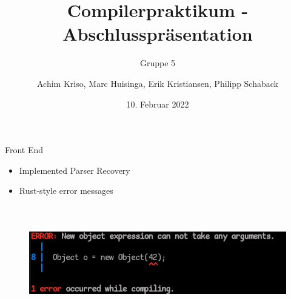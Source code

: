 \documentclass[en,16:9]{sdqbeamer}
\title[]{Compilerpraktikum - Abschlusspräsentation}
\subtitle{Gruppe 5}
\author[]{Achim Kriso, Marc Huisinga, Erik Kristiansen, Philipp Schaback}
\date[10.\,2.\,2022]{10. Februar 2022}
\begin{document}
\KITtitleframe

\begin{frame}{Front End}
	\begin{itemize}
		\item Implemented Parser Recovery
		\item Rust-style error messages
	\end{itemize}

	\begin{figure}
		\centering
		\includegraphics[draft,width=\linewidth,height=5cm]{images/error_message.png}
	\end{figure}
\end{frame}
\end{document}
